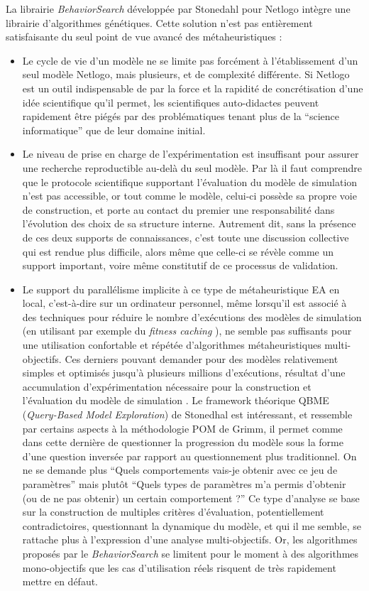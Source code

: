 La librairie \textit{BehaviorSearch} développée par Stonedahl pour Netlogo intègre une librairie d'algorithmes génétiques. Cette solution n'est pas entièrement satisfaisante du seul point de vue avancé des métaheuristiques :
\begin{itemize}
\item Le cycle de vie d'un modèle ne se limite pas forcément à l'établissement d'un seul modèle Netlogo, mais plusieurs, et de complexité différente. Si Netlogo est un outil indispensable de par la force et la rapidité de concrétisation d'une idée scientifique qu'il permet, les scientifiques auto-didactes peuvent rapidement être piégés par des problématiques tenant plus de la \enquote{science informatique} que de leur domaine initial.

\item Le niveau de prise en charge de l'expérimentation est insuffisant pour assurer une recherche reproductible au-delà du seul modèle. Par là il faut comprendre que le protocole scientifique supportant l'évaluation du modèle de simulation n'est pas accessible, or tout comme le modèle, celui-ci possède sa propre voie de construction, et porte au contact du premier une responsabilité dans l'évolution des choix de sa structure interne. Autrement dit, sans la présence de ces deux supports de connaissances, c'est toute une discussion collective qui est rendue plus difficile, alors même que celle-ci se révèle comme un support important, voire même constitutif de ce processus de validation.

\item Le support du parallélisme implicite à ce type de métaheuristique EA en local, c'est-à-dire sur un ordinateur personnel, même lorsqu'il est associé à des techniques pour réduire le nombre d'exécutions des modèles de simulation (en utilisant par exemple du \textit{fitness caching} \autocite[245]{Stonedahl2011a}), ne semble pas suffisants pour une utilisation confortable et répétée d'algorithmes métaheuristiques multi-objectifs. Ces derniers pouvant demander pour des modèles relativement simples et optimisés jusqu'à plusieurs millions d'exécutions, résultat d'une accumulation d'expérimentation nécessaire pour la construction et l'évaluation du modèle de simulation \autocites{Schmitt2014, Cottineau2014b}. Le framework théorique QBME (\textit{Query-Based Model Exploration}) de Stonedhal est intéressant, et ressemble par certains aspects à la méthodologie POM de Grimm, il permet comme dans cette dernière de questionner la progression du modèle sous la forme d'une question inversée par rapport au questionnement plus traditionnel. On ne se demande plus \enquote{Quels comportements vais-je obtenir avec ce jeu de paramètres} mais plutôt \enquote{Quels types de paramètres m'a permis d'obtenir (ou de ne pas obtenir) un certain comportement ?} Ce type d'analyse se base sur la construction de multiples critères d'évaluation, potentiellement contradictoires, questionnant la dynamique du modèle, et qui il me semble, se rattache plus à l'expression d'une analyse multi-objectifs. Or, les algorithmes proposés par le \textit{BehaviorSearch} se limitent pour le moment à des algorithmes mono-objectifs que les cas d'utilisation réels risquent de très rapidement mettre en défaut.


\end{itemize}
